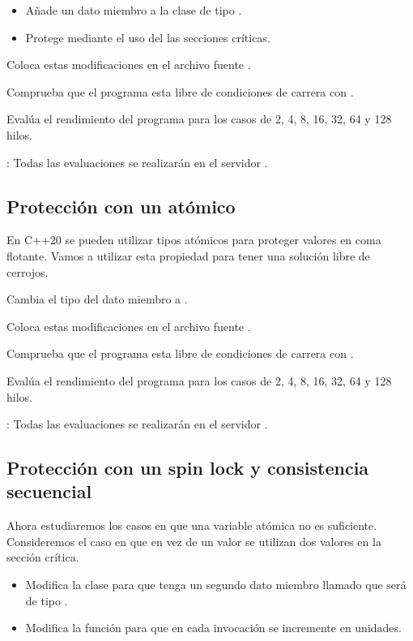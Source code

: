 \begin{itemize}
  \item Añade un dato miembro a la clase  de tipo .
  \item Protege mediante el uso del  las secciones críticas.
\end{itemize}

Coloca estas modificaciones en el archivo fuente .

Comprueba que el programa esta libre de condiciones de carrera con .

Evalúa el rendimiento del programa para los casos de 2, 4, 8, 16, 32, 64 y 128 hilos.

: Todas las evaluaciones se realizarán en el servidor .

\subsection{Protección con un atómico}

En C++20 se pueden utilizar tipos atómicos para proteger valores en coma flotante.
Vamos a utilizar esta propiedad para tener una solución libre de cerrojos.

Cambia el tipo del dato miembro  a .

Coloca estas modificaciones en el archivo fuente .

Comprueba que el programa esta libre de condiciones de carrera con .

Evalúa el rendimiento del programa para los casos de 2, 4, 8, 16, 32, 64 y 128 hilos.

: Todas las evaluaciones se realizarán en el servidor .

\subsection{Protección con un spin lock y consistencia secuencial}

Ahora estudiaremos los casos en que una variable atómica no es suficiente.
Consideremos el caso en que en vez de un valor se utilizan dos valores en la sección crítica.

\begin{itemize}

  \item Modifica la clase  para que tenga un segundo dato miembro 
        llamado  que será de tipo .

  \item Modifica la función  para que en cada invocación se incremente
         en  unidades.

\end{itemize}


